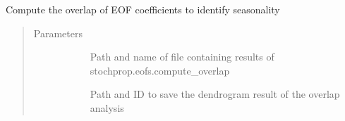 \documentclass[letterpaper,10pt,english]{sphinxmanual}
\begin{document}

\begin{fulllineitems}
\label{\detokenize{stochprop.eofs:stochprop.eofs.compute_seasonality}}
\sphinxAtStartPar
Compute the overlap of EOF coefficients to identify seasonality
\begin{quote}\begin{description}
\item[{Parameters}] \leavevmode\begin{description}
\item[{}] \leavevmode
\sphinxAtStartPar
Path and name of file containing results of stochprop.eofs.compute\_overlap

\item[{}] \leavevmode
\sphinxAtStartPar
Path and ID to save the dendrogram result of the overlap analysis

\end{description}

\end{description}\end{quote}

\end{fulllineitems}

\end{document}
